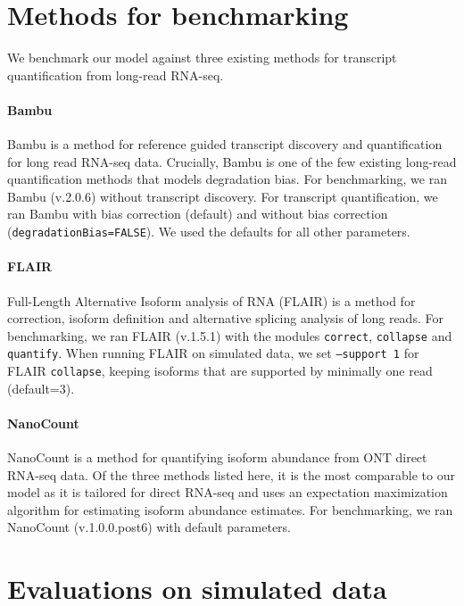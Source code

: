 \section{Methods for benchmarking}

We benchmark our model against three existing methods for transcript quantification from long-read RNA-seq. 

\paragraph{Bambu} Bambu \cite{Bambu2022} is a method for reference guided transcript discovery and quantification for long read RNA-seq data. Crucially, Bambu is one of the few existing long-read quantification methods that models degradation bias. For benchmarking, we ran Bambu (v.2.0.6) without transcript discovery. For transcript quantification, we ran Bambu with bias correction (default) and without bias correction (\texttt{degradationBias=FALSE}). We used the defaults for all other parameters.

\paragraph{FLAIR} Full-Length Alternative Isoform analysis of RNA (FLAIR) \cite{Tang2020} is a method for correction, isoform definition and alternative splicing analysis of long reads. For benchmarking, we ran FLAIR (v.1.5.1) with the modules \texttt{correct}, \texttt{collapse} and \texttt{quantify}. When running FLAIR on simulated data, we set \texttt{--support 1} for FLAIR \texttt{collapse}, keeping isoforms that are supported by minimally one read (default=3).  

\paragraph{NanoCount} NanoCount \cite{Gleeson2021} is a method for quantifying isoform abundance from ONT direct RNA-seq data. Of the three methods listed here, it is the most comparable to our model as it is tailored for direct RNA-seq and uses an expectation maximization algorithm for estimating isoform abundance estimates. For benchmarking, we ran NanoCount (v.1.0.0.post6) with default parameters.

\section{Evaluations on simulated data}\label{sec:eval-sim}

